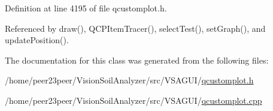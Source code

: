Definition at line 4195 of file qcustomplot.\+h.



Referenced by draw(), Q\+C\+P\+Item\+Tracer(), select\+Test(), set\+Graph(), and update\+Position().



The documentation for this class was generated from the following files\+:\begin{DoxyCompactItemize}
\item 
/home/peer23peer/\+Vision\+Soil\+Analyzer/src/\+V\+S\+A\+G\+U\+I/\hyperlink{qcustomplot_8h}{qcustomplot.\+h}\item 
/home/peer23peer/\+Vision\+Soil\+Analyzer/src/\+V\+S\+A\+G\+U\+I/\hyperlink{qcustomplot_8cpp}{qcustomplot.\+cpp}\end{DoxyCompactItemize}
